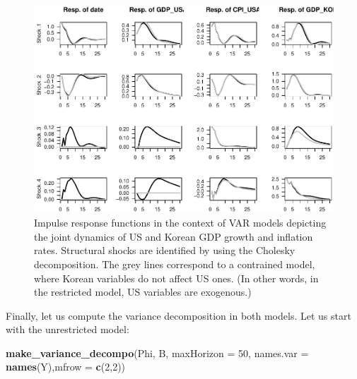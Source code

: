 \documentclass[
  12pt,
]{book}
\newenvironment{Shaded}{\begin{snugshade}}{\end{snugshade}}
\newcommand{\AttributeTok}[1]{\textcolor[rgb]{0.13,0.29,0.53}{#1}}
\newcommand{\DecValTok}[1]{\textcolor[rgb]{0.00,0.00,0.81}{#1}}
\newcommand{\FunctionTok}[1]{\textcolor[rgb]{0.13,0.29,0.53}{\textbf{#1}}}
\newcommand{\NormalTok}[1]{#1}
\theoremstyle{definition}
\theoremstyle{definition}
\theoremstyle{definition}
\theoremstyle{definition}
\theoremstyle{remark}
\begin{document}
\begin{figure}
\includegraphics[width=0.95\linewidth]{IdentifStructShocks_files/figure-latex/IRFblockexog-1} \caption{Impulse response functions in the context of VAR models depicting the joint dynamics of US and Korean GDP growth and inflation rates. Structural shocks are identified by using the Cholesky decomposition. The grey lines correspond to a contrained model, where Korean variables do not affect US ones. (In other words, in the restricted model, US variables are exogenous.)}\label{fig:IRFblockexog}
\end{figure}

Finally, let us compute the variance decomposition in both models. Let us start with the unrestricted model:

\begin{Shaded}
\begin{Highlighting}[]
\FunctionTok{make\_variance\_decompo}\NormalTok{(Phi, B, }\AttributeTok{maxHorizon =} \DecValTok{50}\NormalTok{,}
                      \AttributeTok{names.var =} \FunctionTok{names}\NormalTok{(Y),}\AttributeTok{mfrow =} \FunctionTok{c}\NormalTok{(}\DecValTok{2}\NormalTok{,}\DecValTok{2}\NormalTok{))}
\end{Highlighting}
\end{Shaded}
\end{document}
